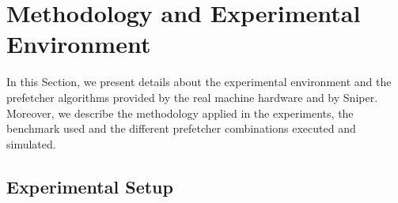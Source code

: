 \documentclass[AMA,final,STIX1COL]{WileyNJD-v2}
\newcommand{\vsg}[1]{\textcolor{blue}{\bfseries \ul{vsgirelli: #1} }\vspace{0.2cm}}
\begin{document}
\section{Methodology and Experimental Environment}\label{sec:experiments}
In this Section, we present details about the experimental environment and the prefetcher algorithms provided by the real machine hardware and by Sniper.
Moreover, we describe the methodology applied in the experiments, the benchmark used and the different prefetcher combinations executed and simulated.


\subsection{Experimental Setup}
\label{subsec:exp-setup}
\end{document}
